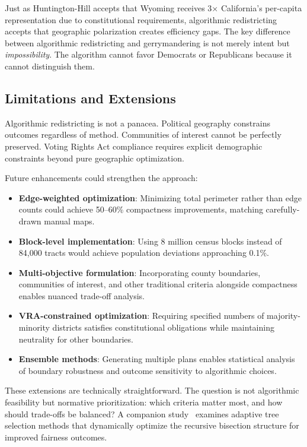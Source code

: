 Just as Huntington-Hill accepts that Wyoming receives 3× California's per-capita representation due to constitutional requirements, algorithmic redistricting accepts that geographic polarization creates efficiency gaps. The key difference between algorithmic redistricting and gerrymandering is not merely intent but \textit{impossibility}. The algorithm cannot favor Democrats or Republicans because it cannot distinguish them.

\subsection{Limitations and Extensions}

Algorithmic redistricting is not a panacea. Political geography constrains outcomes regardless of method. Communities of interest cannot be perfectly preserved. Voting Rights Act compliance requires explicit demographic constraints beyond pure geographic optimization.

Future enhancements could strengthen the approach:

\begin{itemize}
    \item \textbf{Edge-weighted optimization}: Minimizing total perimeter rather than edge counts could achieve 50--60\% compactness improvements, matching carefully-drawn manual maps.
    \item \textbf{Block-level implementation}: Using 8 million census blocks instead of 84,000 tracts would achieve population deviations approaching 0.1\%.
    \item \textbf{Multi-objective formulation}: Incorporating county boundaries, communities of interest, and other traditional criteria alongside compactness enables nuanced trade-off analysis.
    \item \textbf{VRA-constrained optimization}: Requiring specified numbers of majority-minority districts satisfies constitutional obligations while maintaining neutrality for other boundaries.
    \item \textbf{Ensemble methods}: Generating multiple plans enables statistical analysis of boundary robustness and outcome sensitivity to algorithmic choices.
\end{itemize}

These extensions are technically straightforward. The question is not algorithmic feasibility but normative prioritization: which criteria matter most, and how should trade-offs be balanced? A companion study~\citep{dellaLibera2026adaptive} examines adaptive tree selection methods that dynamically optimize the recursive bisection structure for improved fairness outcomes.

